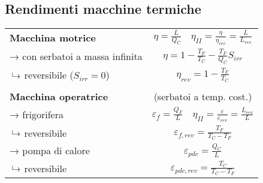 \subsection{Rendimenti macchine termiche}
{\renewcommand{\arraystretch}{1.5}
\begin{tabular}{p{4cm}c}
\textbf{Macchina motrice} & $\eta = \frac{L}{Q_C} \quad \eta_{II} = \frac{\eta}{\eta_{rev}} = \frac{L}{L_{rev}} $ \\
→ con serbatoi a massa infinita & $\eta = 1 - \frac{T_F}{T_C} - \frac{T_F}{Q_C}S_{irr}$ \\
\phantom{→}$\put(3,2){\line(0,1){5}}\to$ reversibile ($S_{irr} = 0$) & $\eta_{rev} = 1 - \frac{T_F}{T_C}$ \\
\\
\textbf{Macchina operatrice} & (serbatoi a temp. cost.) \\
→ frigorifera & $\varepsilon_f = \frac{Q_F}{L} \quad \eta_{II} = \frac{\varepsilon}{\varepsilon_{rev}} = \frac{L_{rev}}{L}$ \\
\phantom{→}$\put(3,2){\line(0,1){5}}\to$ reversibile & $\varepsilon_{f,rev} = \frac{T_F}{T_C - T_F}$ \\
→ pompa di calore & $\varepsilon_{pdc} = \frac{Q_C}{L}$ \\
\phantom{→}$\put(3,2){\line(0,1){5}}\to$ reversibile & $\varepsilon_{pdc,rev} = \frac{T_C}{T_C - T_F}$ \\
\end{tabular}
}
